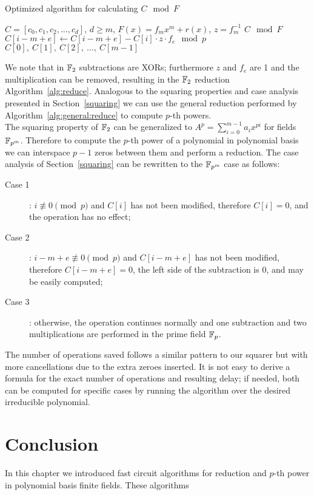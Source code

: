 \begin{algorithm}
\caption{Optimized algorithm for calculating $C \mod F$}
\label{alg:general:reduce}
\begin{algorithmic}[1]
    \REQUIRE $C = [c_0, c_1, c_2, ..., c_d]$, $d \geq m$, $F(x) = f_m x^m + r(x)$, $z = f_m^{-1}$
    \ENSURE $C \mod F$
            \STATE $C[i-m+e] \leftarrow C[i-m+e] - C[i] \cdot z \cdot f_e \mod p$
        \ENDFOR
    \ENDFOR
    \RETURN $C[0],~C[1],~C[2],~\ldots,~C[m-1]$
\end{algorithmic}
\end{algorithm}

We note that in $\mathbb{F}_2$ subtractions are XORs; furthermore $z$ and $f_e$ are 1 and the multiplication can be removed, resulting in the $\mathbb{F}_2$ reduction Algorithm~\ref{alg:reduce}. Analogous to the squaring properties and case analysis presented in Section~\ref{squaring} we can use the general reduction performed by Algorithm~\ref{alg:general:reduce} to compute $p$-th powers. \\

The squaring property of $\mathbb{F}_2$ can be generalized to $A^p = \sum_{i=0}^{m-1} a_i x^{pi}$ for fields $\mathbb{F}_{p^m}$. Therefore to compute the $p$-th power of a polynomial in polynomial basis we can interspace $p-1$ zeros between them and perform a reduction. The case analysis of Section~\ref{squaring} can be rewritten to the $\mathbb{F}_{p^m}$ case as follows:

\begin{description}
\item[Case 1]: $i \not\equiv 0 \pmod{p}$ and $C[i]$ has not been modified, therefore $C[i] = 0$, and the operation has no effect;
\item[Case 2]: $i-m+e \not\equiv 0 \pmod{p}$ and $C[i-m+e]$ has not been modified, therefore $C[i-m+e] = 0$, the left side of the subtraction is $0$, and may be easily computed;
\item[Case 3]: otherwise, the operation continues normally and one subtraction and two multiplications are performed in the prime field $\mathbb{F}_p$.
\end{description}
    
The number of operations saved follows a similar pattern to our squarer but with more cancellations due to the extra zeroes inserted. It is not easy to derive a formula for the exact number of operations and resulting delay; if needed, both can be computed for specific cases by running the algorithm over the desired irreducible polynomial.

\section{Conclusion}

In this chapter we introduced fast circuit algorithms for reduction and $p$-th power in polynomial basis finite fields. These algorithms 

